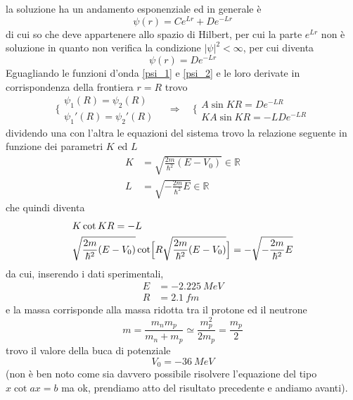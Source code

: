 la soluzione ha un andamento esponenziale ed in generale è
\begin{equation}
\psi(r) = C e^{L r} + D e^{- L r}
\end{equation}
di cui so che deve appartenere allo spazio di Hilbert, per cui la parte $e^{L r}$ non è soluzione in quanto non verifica la condizione $|\psi|^2 < \infty$, per cui diventa
\begin{equation}
\psi(r) = D e^{- L r} 
\label{psi_2}
\end{equation}
Eguagliando le funzioni d'onda \ref{psi_1} e \ref{psi_2} e le loro derivate in corrispondenza della frontiera $r = R$ trovo
\begin{equation}
\Bigg\{\begin{array}{l}
\psi_{1}(R) = \psi_{2}(R)\\
\psi_{1}'(R) = \psi_{2}'(R)
\end{array}
\quad\Rightarrow\quad 
\Bigg\{\begin{array}{l}
A \sin K R = D e^{ - L R }\\
K A \sin K R = -L D e^{ - L R }
\end{array}
\end{equation}
dividendo una con l'altra le equazioni del sistema trovo la relazione seguente in funzione dei parametri $K$ ed $L$
\begin{equation}
\begin{split}
K & = \sqrt{\frac{2m}{\hbar^2} (E - V_0)} \in \mathbb{R} \\
L & = \sqrt{- \frac{2m}{\hbar^2} E} \in \mathbb{R}
\end{split}
\end{equation}
che quindi diventa
\begin{equation}
\begin{split}
& K \cot K R = - L \\
& \sqrt{\frac{2m}{\hbar^2} (E - V_0)} \cot \Bigl[ R \sqrt{\frac{2m}{\hbar^2} (E - V_0)} \Bigr] = - \sqrt{- \frac{2m}{\hbar^2} E}
\end{split}
\end{equation}
da cui, inserendo i dati sperimentali, 
\begin{equation}
\begin{split}
E & = \SI{-2.225}{MeV} \\
R & = \SI{2.1}{fm}
\end{split}
\end{equation}
e la massa corrisponde alla massa ridotta tra il protone ed il neutrone
\begin{equation}
m = \frac{m_n m_p}{m_n + m_p} \simeq \frac{m_p^2}{2 m_p} = \frac{m_p}{2}
\end{equation}
trovo il valore della buca di potenziale
\begin{equation}
V_0 = \SI{-36}{MeV}
\end{equation}
(non è ben noto come sia davvero possibile risolvere l'equazione del tipo $x \cot a x = b$ ma ok, prendiamo atto del risultato precedente e andiamo avanti).


